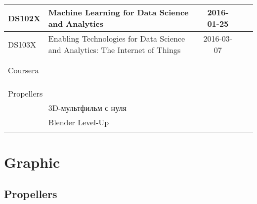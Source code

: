 \documentclass[a4paper,12pt]{article} %
\begin{document}
\begin{longtable}{|l|p{6cm}|c|c|l|}
	\hline
	DS102X & Machine Learning for Data Science and Analytics & 2016-01-25 &  &  \\
	\hline
	DS103X & Enabling Technologies for Data Science and Analytics: The Internet of Things &  2016-03-07 &  &  \\
	\hline
	&  &  &  &  \\
	\hline
	&  &  &  &  \\
	\hline
	\multicolumn{5}{|l|}{Coursera}\\
	\hline
	&  &  &  &  \\
	\hline
	&  &  &  &  \\
	\hline
	&  &  &  &  \\
	\hline
	\multicolumn{5}{|l|}{Propellers}\\
	\hline
	& 3D-мультфильм с нуля &  &  &  \\
	\hline
	& Blender Level-Up &  &  &  \\
	\hline
	&  &  &  &  \\
	\hline
\end{longtable}

\newpage
\section{Graphic}
\subsection{Propellers}
\end{document}

